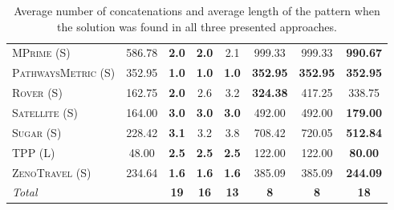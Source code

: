 \documentclass[11pt]{article}
\begin{document}
\begin{table}[tb]
{\begin{tabular}{|l||c||ccc||ccc||}
\textsc{MPrime} (S)&586.78&\textbf{2.0}&\textbf{2.0}&2.1&999.33&999.33&\textbf{990.67}\\
\textsc{PathwaysMetric} (S)&352.95&\textbf{1.0}&\textbf{1.0}&\textbf{1.0}&\textbf{352.95}&\textbf{352.95}&\textbf{352.95}\\
\textsc{Rover} (S)&162.75&\textbf{2.0}&2.6&3.2&\textbf{324.38}&417.25&338.75\\
\textsc{Satellite} (S)&164.00&\textbf{3.0}&\textbf{3.0}&\textbf{3.0}&492.00&492.00&\textbf{179.00}\\
\textsc{Sugar} (S)&228.42&\textbf{3.1}&3.2&3.8&708.42&720.05&\textbf{512.84}\\
\textsc{TPP} (L)&48.00&\textbf{2.5}&\textbf{2.5}&\textbf{2.5}&122.00&122.00&\textbf{80.00}\\
\textsc{ZenoTravel} (S)&234.64&\textbf{1.6}&\textbf{1.6}&\textbf{1.6}&385.09&385.09&\textbf{244.09}
\\\hline
\textit{Total}&&\textbf{19}&\textbf{16}&\textbf{13}&\textbf{8}&\textbf{8}&\textbf{18}\\\hline

        \end{tabular}}
        \caption{Average number of concatenations and average length of the pattern when the solution was found in all three presented approaches.}
        \label{tab:exp-search}
        \end{table}
        
\end{document}
